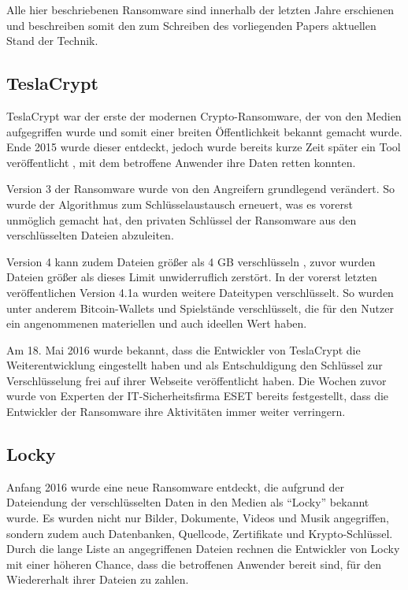 Alle hier beschriebenen Ransomware sind innerhalb der letzten Jahre erschienen und beschreiben somit den zum Schreiben des vorliegenden Papers aktuellen Stand der Technik.

\subsection{TeslaCrypt}
TeslaCrypt war der erste der modernen Crypto-Ransomware, der von den Medien aufgegriffen wurde und somit einer breiten Öffentlichkeit bekannt gemacht wurde. Ende 2015 \cite{tesla:entdeckt} wurde dieser entdeckt, jedoch wurde bereits kurze Zeit später ein Tool veröffentlicht \cite{tesla:geknackt}, mit dem betroffene Anwender ihre Daten retten konnten.

Version 3 der Ransomware wurde von den Angreifern grundlegend verändert. So wurde der Algorithmus zum Schlüsselaustausch erneuert, was es vorerst unmöglich gemacht hat, den privaten Schlüssel der Ransomware aus den verschlüsselten Dateien abzuleiten. \cite{tesla:version3} \cite{tesla:version3_2}

Version 4 kann zudem Dateien größer als 4 GB verschlüsseln \cite{tesla:version4}, zuvor wurden Dateien größer als dieses Limit unwiderruflich zerstört. In der vorerst letzten veröffentlichen Version 4.1a \cite{tesla:version41} wurden weitere Dateitypen verschlüsselt. So wurden unter anderem Bitcoin-Wallets und Spielstände verschlüsselt, die für den Nutzer ein angenommenen materiellen und auch ideellen Wert haben.

Am 18. Mai 2016 wurde bekannt, dass die Entwickler von TeslaCrypt die Weiterentwicklung eingestellt haben und als Entschuldigung den Schlüssel zur Verschlüsselung frei auf ihrer Webseite veröffentlicht haben. Die Wochen zuvor wurde von Experten der IT-Sicherheitsfirma ESET bereits festgestellt, dass die Entwickler der Ransomware ihre Aktivitäten immer weiter verringern. \cite{tesla:end}

\subsection{Locky}
Anfang 2016 \cite{locky:start} wurde eine neue Ransomware entdeckt, die aufgrund der Dateiendung der verschlüsselten Daten in den Medien als ``Locky'' bekannt wurde. Es wurden nicht nur Bilder, Dokumente, Videos und Musik angegriffen, sondern zudem auch Datenbanken, Quellcode, Zertifikate und Krypto-Schlüssel. Durch die lange Liste an angegriffenen Dateien rechnen die Entwickler von Locky mit einer höheren Chance, dass die betroffenen Anwender bereit sind, für den Wiedererhalt ihrer Dateien zu zahlen.

